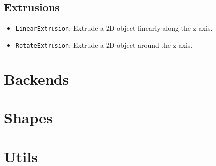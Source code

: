\subsection{Extrusions}

\begin{itemize}
	\item \texttt{LinearExtrusion}: Extrude a 2D object linearly along the z axis.
	\item \texttt{RotateExtrusion}: Extrude a 2D object around the z axis. 
\end{itemize}


\section{Backends}\label{sec:backends}


\section{Shapes}\label{sec:shapes}


\section{Utils}\label{sec:utils}
